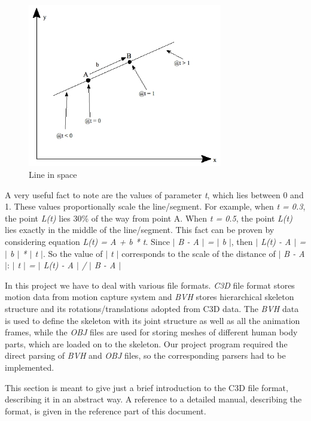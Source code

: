 \documentclass[times, 10pt,twocolumn]{article}
\begin{document}
\begin{figure}[H]
  \caption{Line in space}
  \label{line_in_space}
  \centering
  \includegraphics[width=85mm]{images/lines3d.jpg}
\end{figure}

A very useful fact to note are the values of parameter \emph{t}, which lies between 0 and 1. These values proportionally scale the line/segment. For example, when \emph{t = 0.3}, the point \emph{L(t)} lies 30\% of the way from point A. When \emph{t = 0.5}, the point \emph{L(t)} lies exactly in the middle of the line/segment. This fact can be proven by considering equation \emph{L(t) = A + b * t}. Since \emph{$|$ B - A $|$ = $|$ b $|$}, then \emph{$|$ L(t) - A $|$ = $|$ b $|$ * $|$ t $|$}. So the value of \emph{$|$ t $|$} corresponds to the scale of the distance of \emph{$|$ B - A $|$}: \emph{$|$ t $|$ = $|$ L(t) - A $|$ / $|$ B - A $|$}



In this project we have to deal with various file formats. \emph{C3D} file format stores motion data from motion capture system and \emph{BVH} stores hierarchical skeleton structure and its rotations/translations adopted from C3D data. The \emph{BVH} data is used to define the skeleton with its joint structure as well as all the animation frames, while the \emph{OBJ} files are used for storing meshes of different human body parts, which are loaded on to the skeleton. Our project program required the direct parsing of \emph{BVH} and \emph{OBJ} files, so the corresponding parsers had to be implemented. 


This section is meant to give just a brief introduction to the C3D file format, describing it in an abstract way. A reference to a detailed manual, describing the format, is given in the reference part of this document.
\end{document}
